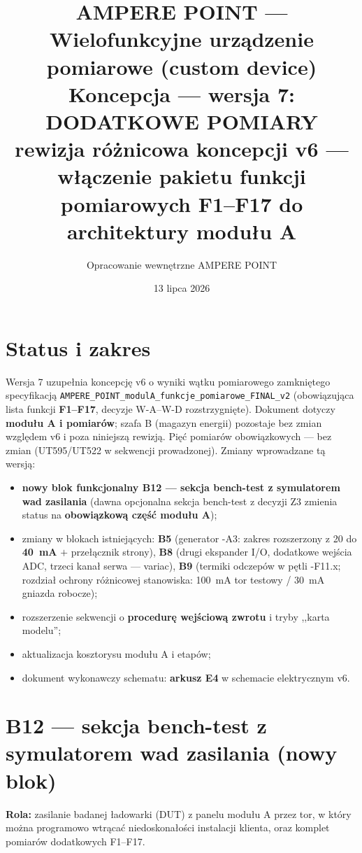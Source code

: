 \documentclass[11pt,a4paper]{article}
\title{\textbf{AMPERE POINT --- Wielofunkcyjne urządzenie pomiarowe (custom device)}\\[4pt]
\large Koncepcja --- wersja 7: DODATKOWE POMIARY\\[2pt]
\normalsize rewizja różnicowa koncepcji v6 --- włączenie pakietu funkcji pomiarowych F1--F17 do
architektury modułu A}
\author{Opracowanie wewnętrzne AMPERE POINT}
\date{13 lipca 2026}
\begin{document}
\maketitle
\vspace{-1.4em}

\section{Status i zakres}
Wersja 7 uzupełnia koncepcję v6 o wyniki wątku pomiarowego zamkniętego specyfikacją
\texttt{AMPERE\_POINT\_modulA\_funkcje\_pomiarowe\_FINAL\_v2} (obowiązująca lista funkcji
\textbf{F1--F17}, decyzje W-A--W-D rozstrzygnięte). Dokument dotyczy \textbf{modułu A i pomiarów};
szafa B (magazyn energii) pozostaje bez zmian względem v6 i poza niniejszą rewizją. Pięć pomiarów
obowiązkowych --- bez zmian (UT595/UT522 w sekwencji prowadzonej). Zmiany wprowadzane tą wersją:
\begin{itemize}
\item \textbf{nowy blok funkcjonalny B12 --- sekcja bench-test z symulatorem wad zasilania}
(dawna opcjonalna sekcja bench-test z decyzji Z3 zmienia status na \textbf{obowiązkową część
modułu A});
\item zmiany w blokach istniejących: \textbf{B5} (generator -A3: zakres rozszerzony z 20 do
\textbf{40~mA} $+$ przełącznik strony), \textbf{B8} (drugi ekspander I/O, dodatkowe wejścia ADC,
trzeci kanał serwa --- variac), \textbf{B9} (termiki odczepów w pętli -F11.x; rozdział ochrony
różnicowej stanowiska: 100~mA tor testowy / 30~mA gniazda robocze);
\item rozszerzenie sekwencji o \textbf{procedurę wejściową zwrotu} i tryby ,,karta modelu'';
\item aktualizacja kosztorysu modułu A i etapów;
\item dokument wykonawczy schematu: \textbf{arkusz E4} w schemacie elektrycznym v6.
\end{itemize}

\section{B12 --- sekcja bench-test z symulatorem wad zasilania (nowy blok)}
\textbf{Rola:} zasilanie badanej ładowarki (DUT) z panelu modułu A przez tor, w który można
programowo wtrącać niedoskonałości instalacji klienta, oraz komplet pomiarów dodatkowych F1--F17.
\end{document}
